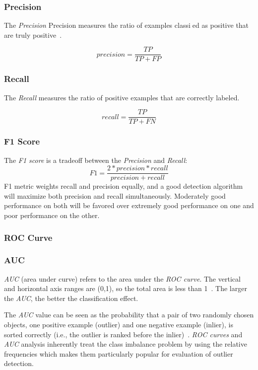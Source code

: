 \subsubsection{Precision}

The \textit{Precision} Precision
measures the ratio of examples classied as positive that 
are truly positive~\cite{ting2010precision}.

\begin{equation}
  precision=\frac{TP}{TP+FP}
\end{equation}

\subsubsection{Recall}
The \textit{Recall} measures the ratio of positive examples that
 are correctly labeled.

\begin{equation}
  recall=\frac{TP}{TP+FN}
\end{equation}

\subsubsection{F1 Score}
The \textit{F1 score} is a tradeoff between 
the \textit{Precision} and \textit{Recall}:
\begin{equation}
  F1=\frac{2*precision*recall}{precision+recall}
\end{equation}
F1 metric weights recall and
precision equally, 
and a good detection algorithm will 
maximize both precision and
recall simultaneously.
Moderately good performance on 
both will be favored over
extremely good performance on 
one and poor performance on the other.

\subsubsection{ROC Curve}


\subsubsection{AUC}
\textit{AUC} (area under curve) refers to the area under the \textit{ROC curve}.
The vertical and horizontal axis ranges are (0,1),
so the total area is less than 1~\cite{bradley1997use}.
The larger the \textit{AUC},
the better the classification effect.

The \textit{AUC} value can be seen as the probability that a pair
of two randomly chosen objects,
one positive example (outlier) 
and one negative example (inlier),
is sorted correctly
(i.e.,
the outlier is ranked before the inlier)~\cite{hanley1982meaning}.
\textit{ROC curves}
and \textit{AUC} analysis inherently treat the class imbalance
problem by using the relative frequencies which makes them
particularly popular for evaluation of outlier detection.


